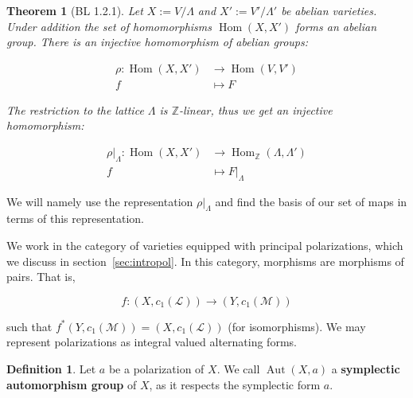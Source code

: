 \documentclass[12pt,reqno]{amsart}
\DeclareMathOperator{\Aut}{Aut}
\DeclareMathOperator{\Hom}{Hom}
\newcommand{\Z}{\mathbb{Z}}
\newcommand{\mc}{\mathcal}
\newtheorem*{thm*}{Theorem}
\theoremstyle{definition}
\newtheorem{defn}{Definition}
\theoremstyle{remark}
\begin{document}



\begin{thm*}[BL 1.2.1] Let $X:= V/\Lambda$ and $X':= V'/\Lambda'$ be abelian varieties. Under addition the set of homomorphisms $\Hom(X, X')$ forms an abelian group. There is an injective homomorphism of abelian groups: 


\begin{align*} 
\rho: \Hom(X, X') &\to \Hom(V, V') \\
f &\mapsto F
\end{align*} 

The restriction to the lattice $\Lambda$ is $\Z$-linear, thus we get an injective homomorphism: 


\begin{align*} 
\rho|_{\Lambda}: \Hom(X, X') &\to \Hom_{\Z}(\Lambda, \Lambda') \\
f &\mapsto F|_{\Lambda}
\end{align*} 


\end{thm*}

We will namely use the representation $\rho|_{\Lambda}$ and find the basis of our set of maps in terms of this representation. 

We work in the category of varieties equipped with principal polarizations, which we discuss in section~\ref{sec:intropol}. In this category, morphisms are morphisms of pairs. That is,

$$f: (X, c_1(\mc{L})) \to (Y, c_1(\mc{M}))$$

such that $f^*(Y, c_1(\mc{M})) = (X, c_1(\mc{L}))$ (for isomorphisms).  We may represent polarizations as integral valued alternating forms. 



\begin{defn} Let $a$ be a polarization of $X$. We call $\Aut(X, a)$ a \textbf{symplectic automorphism group} of $X$, as it respects the symplectic form $a$. 
\end{defn}

\end{document}
